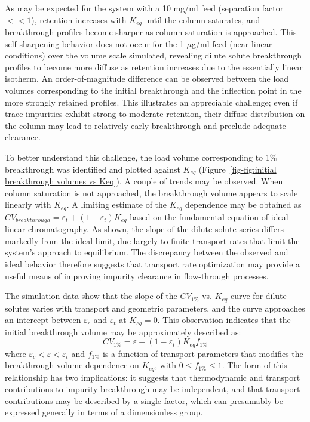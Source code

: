 \documentclass[preprint,review,12pt]{elsarticle}
\begin{document}
        As may be expected for the system with a 10 mg/ml feed (separation factor $<< 1$), retention increases with $K_{eq}$ until the column saturates, and breakthrough profiles become sharper as column saturation is approached. This self-sharpening behavior does not occur for the 1 $\mu$g/ml feed (near-linear conditions) over the volume scale simulated, revealing dilute solute breakthrough profiles to become more diffuse as retention increases due to the essentially linear isotherm. An order-of-magnitude difference can be observed between the load volumes corresponding to the initial breakthrough and the inflection point in the more strongly retained profiles. This illustrates an appreciable challenge; even if trace impurities exhibit strong to moderate retention, their diffuse distribution on the column may lead to relatively early breakthrough and preclude adequate clearance.


        To better understand this challenge, the load volume corresponding to 1\% breakthrough was identified and plotted against $K_{eq}$ (Figure~\ref{fig-fig:initial breakthrough volumes vs Keq}). A couple of trends may be observed. When column saturation is not approached, the breakthrough volume appears to scale linearly with $K_{eq}$. A limiting estimate of the $K_{eq}$ dependence may be obtained as $CV_{breakthrough} = \varepsilon_t + (1 - \varepsilon_t) K_{eq}$ based on the fundamental equation of ideal linear chromatography. As shown, the slope of the dilute solute series differs markedly from the ideal limit, due largely to finite transport rates that limit the system's approach to equilibrium. The discrepancy between the observed and ideal behavior therefore suggests that transport rate optimization may provide a useful means of improving impurity clearance in flow-through processes.

        The simulation data show that the slope of the $CV_{1\%}$ vs. $K_{eq}$ curve for dilute solutes varies with transport and geometric parameters, and the curve approaches an intercept between $\varepsilon_c$ and $\varepsilon_t$ at $K_{eq} = 0$. This observation indicates that the initial breakthrough volume may be approximately described as:
        \begin{equation} \label{eq:hypothesis}
            CV_{1\%} = \varepsilon + (1 - \varepsilon_t) K_{eq} f_{1\%}
        \end{equation}
        where $\varepsilon_c < \varepsilon < \varepsilon_t$ and $f_{1\%}$ is a function of transport parameters that modifies the breakthrough volume dependence on $K_{eq}$, with $0 \leq f_{1\%} \leq 1$. The form of this relationship has two implications:  it suggests that thermodynamic and transport contributions to impurity breakthrough may be independent, and that transport contributions may be described by a single factor, which can presumably be expressed generally in terms of a dimensionless group.
\end{document}
